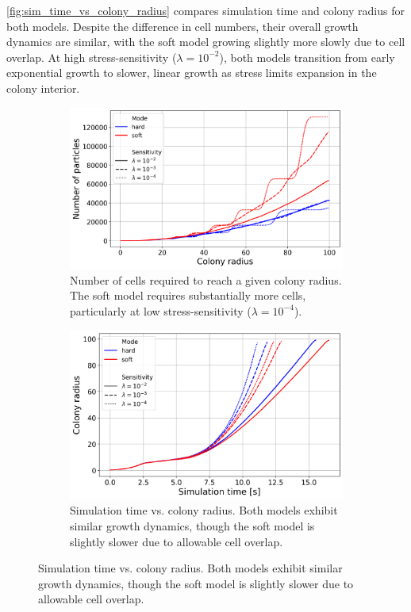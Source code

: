 \documentclass[conference]{IEEEtran}
\begin{document}
\autoref{fig:sim_time_vs_colony_radius} compares simulation time and colony radius for both models. Despite the difference in cell numbers, their overall growth dynamics are similar, with the soft model growing slightly more slowly due to cell overlap. At high stress-sensitivity ($\lambda = 10^{-2}$), both models transition from early exponential growth to slower, linear growth as stress limits expansion in the colony interior.

\begin{figure}[h]
    \centering
    \begin{subfigure}[b]{\linewidth}
        \centering
        \includegraphics[width=\linewidth]{figures/comparison_plots/combined_colony_radius_vs_num_particles.png}
        \caption{Number of cells required to reach a given colony radius. The soft model requires substantially more cells, particularly at low stress-sensitivity ($\lambda = 10^{-4}$).}
        \label{fig:colony_radius_vs_num_cells}
    \end{subfigure}

    \begin{subfigure}[b]{\linewidth}
        \centering
        \includegraphics[width=\linewidth]{figures/comparison_plots/combined_simulation_time [s]_vs_colony_radius.png}
        \caption{Simulation time vs. colony radius. Both models exhibit similar growth dynamics, though the soft model is slightly slower due to allowable cell overlap.}
        \label{fig:sim_time_vs_colony_radius}
    \end{subfigure}


\end{figure}
\end{document}
